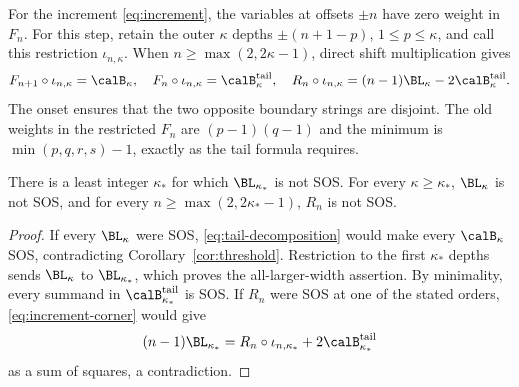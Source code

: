 For the increment \eqref{eq:increment}, the variables at offsets $\pm n$ have zero weight in $F_n$.
For this step, retain the outer $\kappa$ depths
$\pm(n+1-p)$, $1\le p\le \kappa$, and call this restriction $\iota_{n,\kappa}$.
When $n\ge\max(2,2\kappa-1)$, direct shift multiplication gives
\begin{equation}\label{eq:increment-corner}
 F_{n+1}\circ\iota_{n,\kappa}=\calB_\kappa,\quad
 F_n\circ\iota_{n,\kappa}=\calB_\kappa^{\rm tail},\quad
 R_n\circ\iota_{n,\kappa}=(n-1)\BL_\kappa-2\calB_\kappa^{\rm tail}.
\end{equation}
The onset ensures that the two opposite boundary strings are disjoint.
The old weights in the restricted $F_n$ are $(p-1)(q-1)$ and the
minimum is $\min(p,q,r,s)-1$, exactly as the tail formula requires.

\begin{corollary}\label{cor:boundary}
There is a least integer $\kappa_*$ for which $\BL_{\kappa_*}$ is not SOS.
For every $\kappa\ge \kappa_*$, $\BL_\kappa$ is not SOS, and for every
$n\ge\max(2,2\kappa_*-1)$, $R_n$ is not SOS.
\end{corollary}
\begin{proof}
If every $\BL_\kappa$ were SOS, \eqref{eq:tail-decomposition} would make
every $\calB_\kappa$ SOS, contradicting Corollary~\ref{cor:threshold}.
Restriction to the first $\kappa_*$ depths sends $\BL_\kappa$ to $\BL_{\kappa_*}$,
which proves the all-larger-width assertion.
By minimality, every summand in $\calB_{\kappa_*}^{\rm tail}$ is SOS. If $R_n$ were SOS at
one of the stated orders, \eqref{eq:increment-corner} would give
\[
 (n-1)\BL_{\kappa_*}=R_n\circ\iota_{n,\kappa_*}+2\calB_{\kappa_*}^{\rm tail}
\]
as a sum of squares, a contradiction.
\end{proof}
